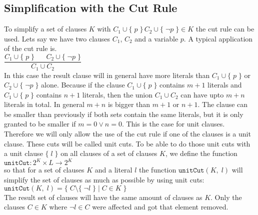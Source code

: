 \subsection{Simplification with the Cut Rule} 
To simplify a set of clauses $K$ with $C_1 \cup \{\; p\; \}\, C_2 \cup \{\; \neg p\; \} \in K$ the cut rule can be used. Lets say we have two clauses $C_1$, $C_2$ and a variable $p$. A typical application of the cut rule is.
\\
\hspace*{1.3cm}
$\dfrac{C_1 \cup \{\; p\; \} \;\;\;\;\;\; C_2 \cup \{\; \neg p\; \}}{C_1 \cup C_2}$
\\[0.2cm]
In this case the result clause will in general have more literals than $C_1 \cup \{\; p\; \}$ or $C_2 \cup \{\; \neg p\; \}$ alone. Because if the clause $C_1 \cup \{\; p\; \}$ contains $m + 1$ literals and $C_1 \cup \{\; p\; \}$ contains $n + 1$ literals, then the union $C_1 \cup C_2$ can have upto $m + n$ literals in total. In general $m + n$ is bigger than $m + 1$ or $n + 1$. The clause can be smaller than previously if both sets contain the same literals, but it is only granted to be smaller if $m = 0 \lor n = 0$. This is the case for unit clauses. Therefore we will only allow the use of the cut rule if one of the clauses is a unit clause. These cuts will be called unit cuts. To be able to do those unit cuts with a unit clause $\{\; l\; \}$ on all clauses of a set of clauses $K$, we define the function
\\
\hspace*{1.3cm}
$\texttt{unitCut}: 2^{K} \times L \to 2^{K}$
\\[0.2cm]
so that for a set of clauses $K$ and a literal $l$ the function $\texttt{unitCut}(K,\; l)$ will simplify the set of clauses as much as possible by using unit cuts:
\\
\hspace*{1.3cm}
$\texttt{unitCut}(K,\; l) = \{\; C \setminus \{\; \neg l\; \}\; |\; C \in K\; \}$
\\[0.2cm]
The result set of clauses will have the same amount of clauses as $K$. Only the clauses $C \in K$ where $\neg l \in C$ were affected and got that element removed. \cite{Stroetman2019}

